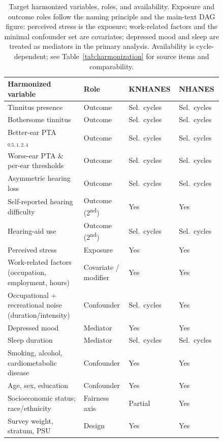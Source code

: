 \begin{table}[htbp]
\centering
\caption{Target harmonized variables, roles, and availability. Exposure and outcome roles follow the naming principle and the main-text DAG figure: perceived stress is the exposure; work-related factors and the minimal confounder set are covariates; depressed mood and sleep are treated as mediators in the primary analysis. Availability is cycle-dependent; see Table~\ref{tab:harmonization} for source items and comparability.}
\label{tab:variables}
\small
\begin{tabular}{p{0.34\linewidth}p{0.20\linewidth}p{0.15\linewidth}p{0.15\linewidth}}
\toprule
Harmonized variable & Role & KNHANES & NHANES \\
\midrule
Tinnitus presence & Outcome & Sel.\ cycles & Sel.\ cycles \\
Bothersome tinnitus & Outcome & Sel.\ cycles & Sel.\ cycles \\
Better-ear PTA$_{0.5,1,2,4}$ & Outcome & Sel.\ cycles & Sel.\ cycles \\
Worse-ear PTA \& per-ear thresholds & Outcome & Sel.\ cycles & Sel.\ cycles \\
Asymmetric hearing loss & Outcome & Sel.\ cycles & Sel.\ cycles \\
Self-reported hearing difficulty & Outcome (2\textsuperscript{nd}) & Yes & Yes \\
Hearing-aid use & Outcome (2\textsuperscript{nd}) & Sel.\ cycles & Sel.\ cycles \\
Perceived stress & Exposure & Yes & Yes \\
Work-related factors (occupation, employment, hours) & Covariate / modifier & Yes & Yes \\
Occupational + recreational noise (duration/intensity) & Confounder & Sel.\ cycles & Yes \\
Depressed mood & Mediator & Yes & Yes \\
Sleep duration & Mediator & Sel.\ cycles & Sel.\ cycles \\
Smoking, alcohol, cardiometabolic disease & Confounder & Yes & Yes \\
Age, sex, education & Confounder & Yes & Yes \\
Socioeconomic status; race/ethnicity & Fairness axis & Partial & Yes \\
Survey weight, stratum, PSU & Design & Yes & Yes \\
\bottomrule
\end{tabular}
\end{table}
